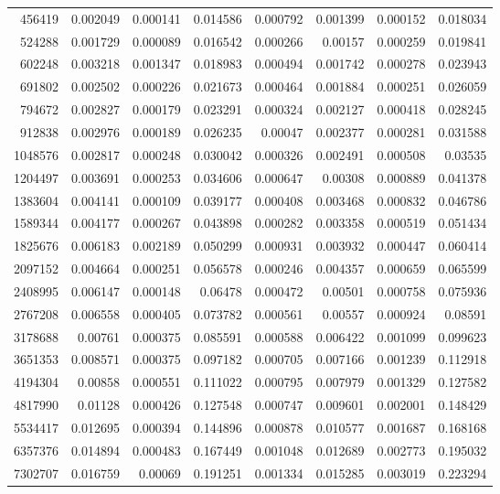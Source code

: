 \begin{longtable}{r r r r r r r r}
456419 & 0.002049 & 0.000141 & 0.014586 & 0.000792 & 0.001399 & 0.000152 & 0.018034 \\
524288 & 0.001729 & 0.000089 & 0.016542 & 0.000266 & 0.00157 & 0.000259 & 0.019841 \\
602248 & 0.003218 & 0.001347 & 0.018983 & 0.000494 & 0.001742 & 0.000278 & 0.023943 \\
691802 & 0.002502 & 0.000226 & 0.021673 & 0.000464 & 0.001884 & 0.000251 & 0.026059 \\
794672 & 0.002827 & 0.000179 & 0.023291 & 0.000324 & 0.002127 & 0.000418 & 0.028245 \\
912838 & 0.002976 & 0.000189 & 0.026235 & 0.00047 & 0.002377 & 0.000281 & 0.031588 \\
1048576 & 0.002817 & 0.000248 & 0.030042 & 0.000326 & 0.002491 & 0.000508 & 0.03535 \\
1204497 & 0.003691 & 0.000253 & 0.034606 & 0.000647 & 0.00308 & 0.000889 & 0.041378 \\
1383604 & 0.004141 & 0.000109 & 0.039177 & 0.000408 & 0.003468 & 0.000832 & 0.046786 \\
1589344 & 0.004177 & 0.000267 & 0.043898 & 0.000282 & 0.003358 & 0.000519 & 0.051434 \\
1825676 & 0.006183 & 0.002189 & 0.050299 & 0.000931 & 0.003932 & 0.000447 & 0.060414 \\
2097152 & 0.004664 & 0.000251 & 0.056578 & 0.000246 & 0.004357 & 0.000659 & 0.065599 \\
2408995 & 0.006147 & 0.000148 & 0.06478 & 0.000472 & 0.00501 & 0.000758 & 0.075936 \\
2767208 & 0.006558 & 0.000405 & 0.073782 & 0.000561 & 0.00557 & 0.000924 & 0.08591 \\
3178688 & 0.00761 & 0.000375 & 0.085591 & 0.000588 & 0.006422 & 0.001099 & 0.099623 \\
3651353 & 0.008571 & 0.000375 & 0.097182 & 0.000705 & 0.007166 & 0.001239 & 0.112918 \\
4194304 & 0.00858 & 0.000551 & 0.111022 & 0.000795 & 0.007979 & 0.001329 & 0.127582 \\
4817990 & 0.01128 & 0.000426 & 0.127548 & 0.000747 & 0.009601 & 0.002001 & 0.148429 \\
5534417 & 0.012695 & 0.000394 & 0.144896 & 0.000878 & 0.010577 & 0.001687 & 0.168168 \\
6357376 & 0.014894 & 0.000483 & 0.167449 & 0.001048 & 0.012689 & 0.002773 & 0.195032 \\
7302707 & 0.016759 & 0.00069 & 0.191251 & 0.001334 & 0.015285 & 0.003019 & 0.223294 \\

\end{longtable}

